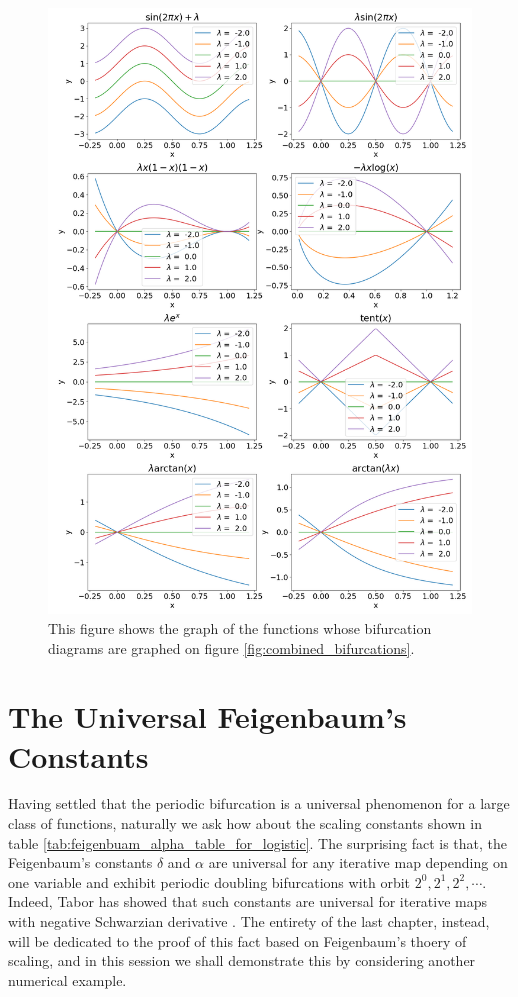 \begin{figure}
	\centering
	\includegraphics[width=\textwidth]{./figures/combined_functions.png}
	\caption{
		This figure shows the graph of the functions whose bifurcation diagrams are graphed on figure \ref{fig:combined_bifurcations}.
	}
	\label{fig:combined_bifurcations_functions_graph}
\end{figure}


\section{The Universal Feigenbaum's Constants}\label{sec:universal_feigenbaum_constants_numerics_demonstration}

Having settled that the periodic bifurcation is a universal phenomenon for a large class of functions, naturally we ask how about the scaling constants shown in table \ref{tab:feigenbuam_alpha_table_for_logistic}.
The surprising fact is that, the Feigenbaum's constants $\delta$ and $\alpha$ are universal for any iterative map depending on one variable and exhibit periodic doubling bifurcations with orbit $2^0, 2^1, 2^2, \cdots$. 
Indeed, Tabor has showed that such constants are universal for iterative maps with negative Schwarzian derivative \cite{Tabor}.
The entirety of the last chapter, instead, will be dedicated to the proof of this fact based on Feigenbaum's thoery of scaling, and in this session we shall demonstrate this by considering another numerical example.

